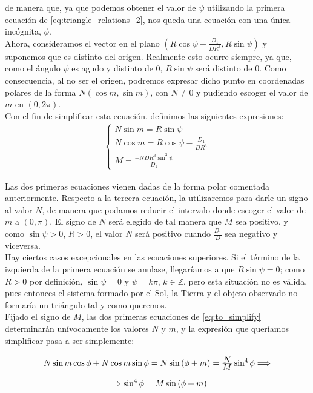 \documentclass[11pt]{book}
\newcommand\ddfrac[2]{\frac{\displaystyle #1}{\displaystyle #2}}
\begin{document}
\noindent de manera que, ya que podemos obtener el valor de $\psi$ utilizando la primera ecuación de \eqref{eq:triangle_relations_2}, nos queda una ecuación con una única incógnita, $\phi$.\\

Ahora, consideramos el vector en el plano $(R\cos{\psi}-\ddfrac{D_1}{DR^3},R\sin{\psi})$ y suponemos que es distinto del origen. Realmente esto ocurre siempre, ya que, como el ángulo $\psi$ es agudo y distinto de $0$, $R\sin{\psi}$ será distinto de $0$. Como consecuencia, al no ser el origen, podremos expresar dicho punto en coordenadas polares de la forma $N(\cos{m},\sin{m})$, con $N\neq0$ y pudiendo escoger el valor de $m$ en $(0,2\pi)$.\\

Con el fin de simplificar esta ecuación, definimos las siguientes expresiones:
\begin{align}
\left\{
\begin{array}{l}
	N\sin{m}=R\sin{\psi}\\
	N\cos{m}=R\cos{\psi}-\ddfrac{D_1}{DR^3}\\
	M=\ddfrac{-NDR^3\sin^3{\psi}}{D_1}
\end{array}
\right.
\label{eq:to_simplify}
\end{align}

Las dos primeras ecuaciones vienen dadas de la forma polar comentada anteriormente. Respecto a la tercera ecuación, la utilizaremos para darle un signo al valor $N$, de manera que podamos reducir el intervalo donde escoger el valor de $m$ a $(0,\pi)$. El signo de $N$ será elegido de tal manera que $M$ sea positivo, y como $\sin{\psi}>0$, $R>0$, el valor $N$ será positivo cuando $\ddfrac{D_1}{D}$ sea negativo y viceversa.\\

Hay ciertos casos excepcionales en las ecuaciones superiores. Si el término de la izquierda de la primera ecuación se anulase, llegaríamos a que $R\sin{\psi}=0$; como $R>0$ por definición, $\sin{\psi}=0$ y $\psi=k\pi$, $k\in\mathbb{Z}$, pero esta situación no es válida, pues entonces el sistema formado por el Sol, la Tierra y el objeto observado no formaría un triángulo tal y como queremos.\\

Fijado el signo de $M$, las dos primeras ecuaciones de \eqref{eq:to_simplify} determinarán unívocamente los valores $N$ y $m$, y la expresión que queríamos simplificar pasa a ser simplemente:
\begin{align}
\def\arraystretch{2}
\begin{array}{c}
	N\sin{m}\cos{\phi}+N\cos{m}\sin{\phi}=N\sin{(\phi+m)}=\ddfrac{N}{M}\sin^4{\phi} \Longrightarrow\\
	\Longrightarrow\sin^4{\phi}=M\sin{(\phi+m)}
\end{array}
\label{eq:phi_solution}
\end{align}
\end{document}
